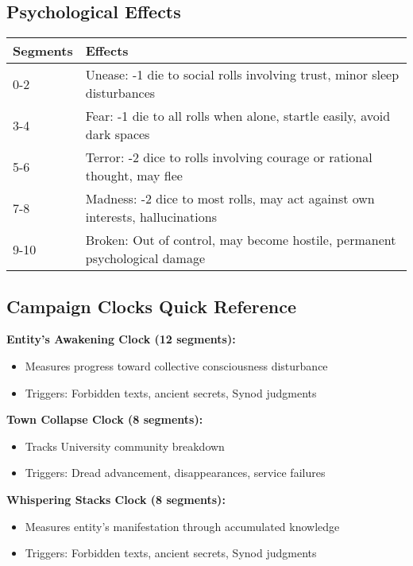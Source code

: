 \documentclass[11pt]{article}
\begin{document}
\subsection*{Psychological Effects}

\begin{tabular}{|p{2cm}|p{10cm}|}
\hline
\rowcolor{tableheader}
\textbf{Segments} & \textbf{Effects} \\
\hline
0-2 & Unease: -1 die to social rolls involving trust, minor sleep disturbances \\
3-4 & Fear: -1 die to all rolls when alone, startle easily, avoid dark spaces \\
5-6 & Terror: -2 dice to rolls involving courage or rational thought, may flee \\
7-8 & Madness: -2 dice to most rolls, may act against own interests, hallucinations \\
9-10 & Broken: Out of control, may become hostile, permanent psychological damage \\
\hline
\end{tabular}

\subsection*{Campaign Clocks Quick Reference}

\textbf{Entity's Awakening Clock (12 segments):}
\begin{itemize}
\item Measures progress toward collective consciousness disturbance
\item Triggers: Forbidden texts, ancient secrets, Synod judgments
\end{itemize}

\textbf{Town Collapse Clock (8 segments):}
\begin{itemize}
\item Tracks University community breakdown
\item Triggers: Dread advancement, disappearances, service failures
\end{itemize}

\textbf{Whispering Stacks Clock (8 segments):}
\begin{itemize}
\item Measures entity's manifestation through accumulated knowledge
\item Triggers: Forbidden texts, ancient secrets, Synod judgments
\end{itemize}
\end{document}
